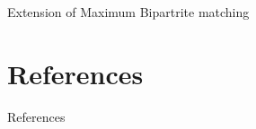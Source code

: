 \documentclass{beamer}
\begin{document}
\begin{frame}{Extension of Maximum Bipartrite matching}
\begin{tikzpicture}
        \end{tikzpicture}
    
    
\end{frame}

\section{References}

\begin{frame}{References}


\end{frame}
\end{document}

